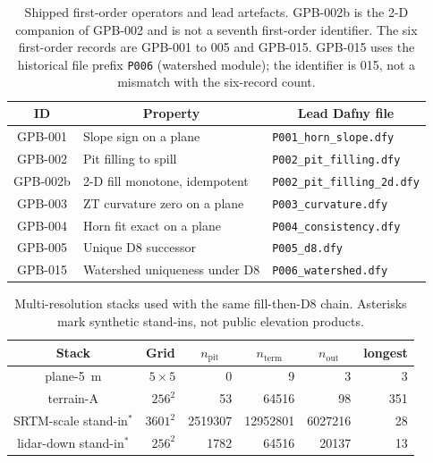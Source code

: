 \documentclass[11pt,a4paper]{article}
\newcommand{\thead}[1]{\multicolumn{1}{c}{#1}}
\begin{document}
\begin{table}[!htbp]
\centering
\caption{Shipped first-order operators and lead artefacts. GPB-002b is
the 2-D companion of GPB-002 and is not a seventh first-order
identifier. The six first-order records are GPB-001 to 005 and GPB-015.
GPB-015 uses the historical file prefix \texttt{P006} (watershed module);
the identifier is 015, not a mismatch with the six-record count.}
\label{tab:operators}
\begin{tabular}{cll}
\toprule
\thead{ID} & \thead{Property} & \thead{Lead Dafny file} \\
\midrule
GPB-001 & Slope sign on a plane & \texttt{P001\_horn\_slope.dfy} \\
GPB-002 & Pit filling to spill & \texttt{P002\_pit\_filling.dfy} \\
GPB-002b & 2-D fill monotone, idempotent & \texttt{P002\_pit\_filling\_2d.dfy} \\
GPB-003 & ZT curvature zero on a plane & \texttt{P003\_curvature.dfy} \\
GPB-004 & Horn fit exact on a plane & \texttt{P004\_consistency.dfy} \\
GPB-005 & Unique D8 successor & \texttt{P005\_d8.dfy} \\
GPB-015 & Watershed uniqueness under D8 & \texttt{P006\_watershed.dfy} \\
\bottomrule
\end{tabular}
\end{table}

\begin{table}[!htbp]
\centering
\caption{Multi-resolution stacks used with the same fill-then-D8 chain.
Asterisks mark synthetic stand-ins, not public elevation products.}
\label{tab:dems}
\begin{tabular}{crrrrr}
\toprule
\thead{Stack} & \thead{Grid} & \thead{$n_{\mathrm{pit}}$} &
\thead{$n_{\mathrm{term}}$} & \thead{$n_{\mathrm{out}}$} &
\thead{longest} \\
\midrule
plane-5~m & $5\times5$ & 0 & 9 & 3 & 3 \\
terrain-A & $256^{2}$ & 53 & 64516 & 98 & 351 \\
SRTM-scale stand-in$^{*}$ & $3601^{2}$ & 2519307 & 12952801 & 6027216 & 28 \\
lidar-down stand-in$^{*}$ & $256^{2}$ & 1782 & 64516 & 20137 & 13 \\
\bottomrule
\end{tabular}
\end{table}
\end{document}
